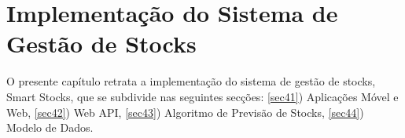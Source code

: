 %
%
\chapter{Implementação do Sistema de Gestão de Stocks} \label{cap4}

O presente capítulo retrata a implementação do sistema de gestão de stocks, Smart Stocks, que se subdivide nas seguintes secções: \ref{sec41}) Aplicações Móvel e Web, \ref{sec42}) Web API, \ref{sec43}) Algoritmo de Previsão de Stocks, \ref{sec44}) Modelo de Dados.




